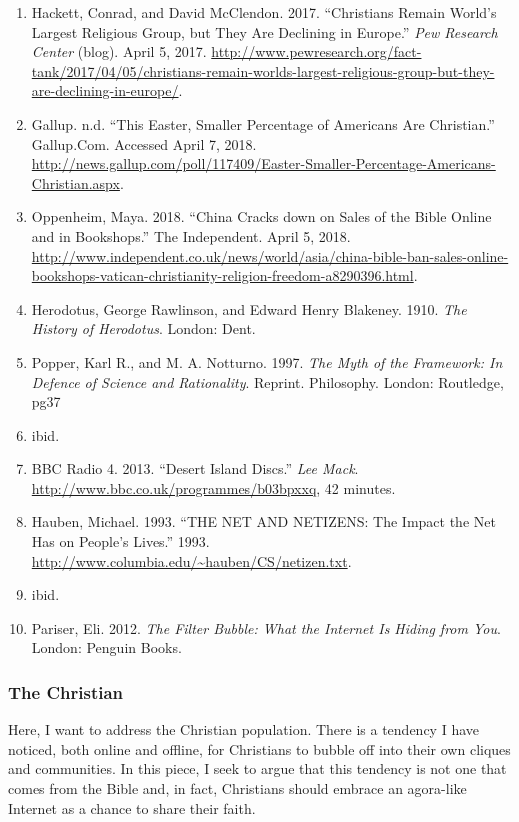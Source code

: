 \documentclass[]{article}
\providecommand{\tightlist}{%
  \setlength{\itemsep}{0pt}\setlength{\parskip}{0pt}}
\begin{document}
\begin{enumerate}
\def\labelenumi{\arabic{enumi}.}
\setcounter{enumi}{1}
\tightlist
\item
  Hackett, Conrad, and David McClendon. 2017. ``Christians Remain
  World's Largest Religious Group, but They Are Declining in Europe.''
  \emph{Pew Research Center} (blog). April 5, 2017.
  \url{http://www.pewresearch.org/fact-tank/2017/04/05/christians-remain-worlds-largest-religious-group-but-they-are-declining-in-europe/}.
\item
  Gallup. n.d. ``This Easter, Smaller Percentage of Americans Are
  Christian.'' Gallup.Com. Accessed April 7, 2018.
  \url{http://news.gallup.com/poll/117409/Easter-Smaller-Percentage-Americans-Christian.aspx}.
\item
  Oppenheim, Maya. 2018. ``China Cracks down on Sales of the Bible
  Online and in Bookshops.'' The Independent. April 5, 2018.
  \url{http://www.independent.co.uk/news/world/asia/china-bible-ban-sales-online-bookshops-vatican-christianity-religion-freedom-a8290396.html}.
\item
  Herodotus, George Rawlinson, and Edward Henry Blakeney. 1910.
  \emph{The History of Herodotus}. London: Dent.
\item
  Popper, Karl R., and M. A. Notturno. 1997. \emph{The Myth of the
  Framework: In Defence of Science and Rationality}. Reprint.
  Philosophy. London: Routledge, pg37
\item
  ibid.
\item
  BBC Radio 4. 2013. ``Desert Island Discs.'' \emph{Lee Mack}.
  \url{http://www.bbc.co.uk/programmes/b03bpxxq}, 42 minutes.
\item
  Hauben, Michael. 1993. ``THE NET AND NETIZENS: The Impact the Net Has
  on People's Lives.'' 1993.
  \url{http://www.columbia.edu/~hauben/CS/netizen.txt}.
\item
  ibid.
\item
  Pariser, Eli. 2012. \emph{The Filter Bubble: What the Internet Is
  Hiding from You}. London: Penguin Books.
\end{enumerate}

\hypertarget{the-christian}{%
\subsubsection{The Christian}\label{the-christian}}

Here, I want to address the Christian population. There is a tendency I
have noticed, both online and offline, for Christians to bubble off into
their own cliques and communities. In this piece, I seek to argue that
this tendency is not one that comes from the Bible and, in fact,
Christians should embrace an agora-like Internet as a chance to share
their faith.
\end{document}
